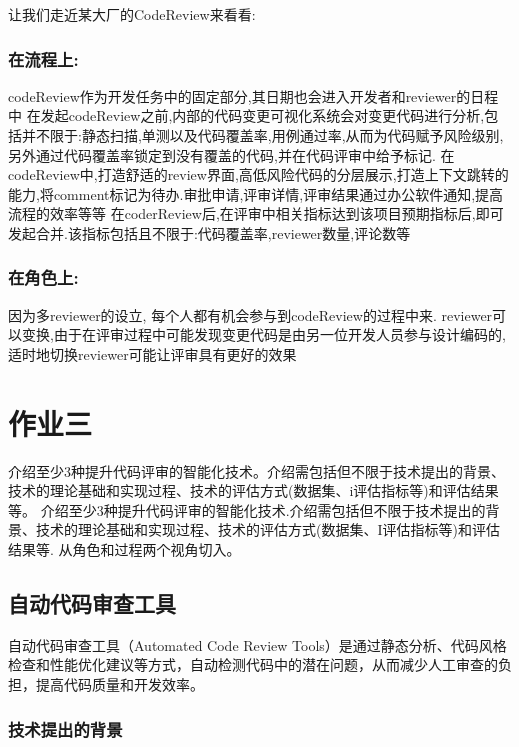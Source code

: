 \documentclass{article}
\begin{document}
让我们走近某大厂的CodeReview来看看:
\subsubsection{在流程上:}
codeReview作为开发任务中的固定部分,其日期也会进入开发者和reviewer的日程中\newline
在发起codeReview之前,内部的代码变更可视化系统会对变更代码进行分析,包括并不限于:静态扫描,单测以及代码覆盖率,用例通过率,从而为代码赋予风险级别,另外通过代码覆盖率锁定到没有覆盖的代码,并在代码评审中给予标记.\newline
在codeReview中,打造舒适的review界面,高低风险代码的分层展示,打造上下文跳转的能力,将comment标记为待办.审批申请,评审详情,评审结果通过办公软件通知,提高流程的效率等等\newline
在coderReview后,在评审中相关指标达到该项目预期指标后,即可发起合并.该指标包括且不限于:代码覆盖率,reviewer数量,评论数等\newline
\subsubsection{在角色上:}
因为多reviewer的设立, 每个人都有机会参与到codeReview的过程中来.\newline
reviewer可以变换,由于在评审过程中可能发现变更代码是由另一位开发人员参与设计编码的,适时地切换reviewer可能让评审具有更好的效果\newline


\section{作业三}
介绍至少3种提升代码评审的智能化技术。介绍需包括但不限于技术提出的背景、技术的理论基础和实现过程、技术的评估方式(数据集、i评估指标等)和评估结果等。
介绍至少3种提升代码评审的智能化技术.介绍需包括但不限于技术提出的背景、技术的理论基础和实现过程、技术的评估方式(数据集、I评估指标等)和评估结果等.
从角色和过程两个视角切入。

\subsection{自动代码审查工具}

自动代码审查工具（Automated Code Review Tools）是通过静态分析、代码风格检查和性能优化建议等方式，自动检测代码中的潜在问题，从而减少人工审查的负担，提高代码质量和开发效率。

\subsubsection{技术提出的背景}
\end{document}
